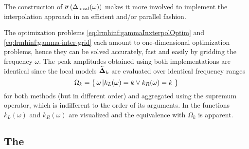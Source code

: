 \begin{remark}
The construction of $  \overline{\sigma} \left( \Delta_{\mathrm{local}}(\omega) \right) $  makes it more involved to implement the interpolation approach in an efficient and/or parallel fashion.
\end{remark}

\begin{remark}
The optimization problems \eqref{eq:lrmhinf:gammaInxterpolOptim} and \eqref{eq:lrmhinf:gamma-inter-grid} each amount to one-dimensional optimization problems, hence they can be solved accurately, fast and easily by gridding the frequency $\omega$.
The peak amplitudes obtained using both implementations are identical since the local models $\widetilde{\mathbf{\Delta}}_k$ are evaluated over identical frequency ranges
 \begin{equation}
  \Omega_k = \Set{\omega \left| k_L(\omega) = k \vee k_R(\omega) = k \right.}
 \end{equation}
for both methods (but in different order) and aggregated using the supremum operator, which is indifferent to the order of its arguments.
In  the functions $k_L(\omega)$ and $k_R(\omega)$ are visualized and the equivalence with $\Omega_k$ is apparent.
\end{remark}

\subsection{The }
\label{sec:lrmhinf:LRM}


